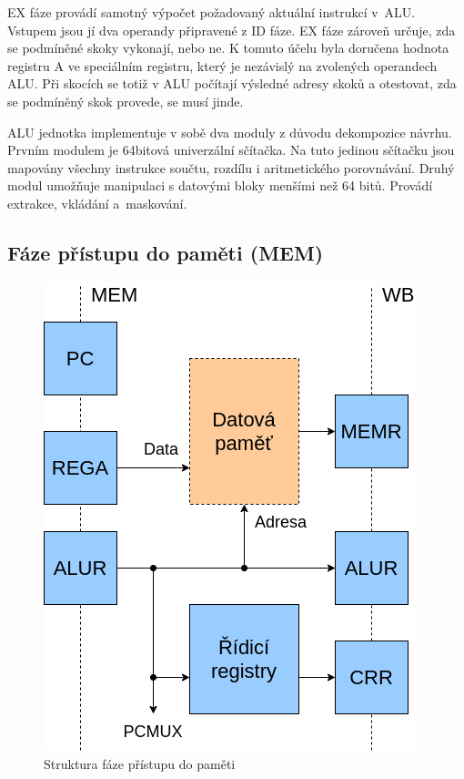 \documentclass[
  digital, %
  color,   %
  table,   %
  twoside, %
  nolof,   %
  nolot,   %
]{fithesis3}
\begin{document}
EX fáze provádí samotný výpočet požadovaný aktuální instrukcí v~ALU. Vstupem jsou jí dva operandy připravené z ID fáze. EX fáze zároveň určuje, zda se podmíněné skoky vykonají, nebo ne. K tomuto účelu byla doručena hodnota registru A ve speciálním registru, který je nezávislý na zvolených operandech ALU. Při skocích se totiž v ALU počítají výsledné adresy skoků a otestovat, zda se podmíněný skok provede, se musí jinde.

ALU jednotka implementuje v sobě dva moduly z důvodu dekompozice návrhu. Prvním modulem je 64bitová univerzální sčítačka. Na tuto jedinou sčítačku jsou mapovány všechny instrukce součtu, rozdílu i aritmetického porovnávání. Druhý modul umožňuje manipulaci s datovými bloky menšími než 64 bitů. Provádí extrakce, vkládání a~maskování. \newpage

\subsection{Fáze přístupu do paměti (MEM)}
\begin{figure}[H]
  \begin{center}
    \includegraphics[height=0.3\textheight]{img/risc63-mem}
  \end{center}
  \caption{Struktura fáze přístupu do paměti}
\end{figure}
\end{document}
